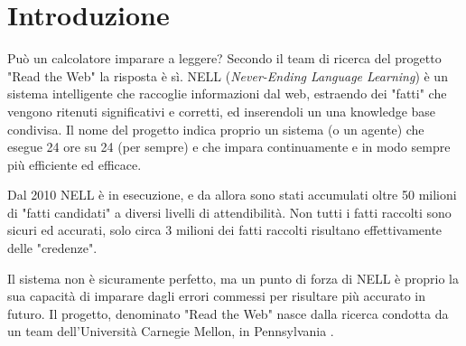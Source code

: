\section*{Introduzione}
Può un calcolatore imparare a leggere? Secondo il team di ricerca del progetto "Read the Web" la risposta è sì.\newline
NELL (\textit{Never-Ending Language Learning}) è un sistema intelligente che raccoglie informazioni dal web, estraendo dei "fatti" che vengono ritenuti significativi e corretti, ed inserendoli un una knowledge base condivisa. Il nome del progetto indica proprio un sistema (o un agente) che esegue 24 ore su 24 (per sempre) e che impara continuamente e in modo sempre più efficiente ed efficace.

\noindent Dal 2010 NELL è in esecuzione, e da allora sono stati accumulati oltre 50 milioni di "fatti candidati" a diversi livelli di attendibilità.\newline
Non tutti i fatti raccolti sono sicuri ed accurati, solo circa 3 milioni dei fatti raccolti risultano effettivamente delle "credenze".

\noindent Il sistema non è sicuramente perfetto, ma un punto di forza di NELL è proprio la sua capacità di imparare dagli errori commessi per risultare più accurato in futuro.\newline
Il progetto, denominato "Read the Web" nasce dalla ricerca condotta da un team dell'Università Carnegie Mellon, in Pennsylvania \cite{ReadtheWeb:online}.

\newpage